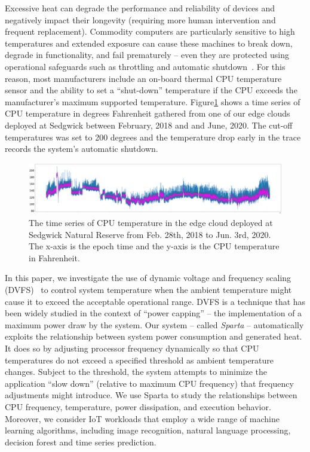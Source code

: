 Excessive heat can degrade the performance and reliability of devices and negatively
impact their longevity (requiring more human intervention and frequent
replacement). Commodity computers are particularly sensitive to high temperatures and
extended exposure can cause these machines to break down, degrade in functionality,
and fail prematurely -- even they are protected using operational safeguards
such as throttling and automatic shutdown~\cite{ref:overheating}.
For this reason, most manufacturers include an on-board thermal CPU
temperature sensor and the ability to set a ``shut-down'' temperature if the
CPU exceeds the manufacturer's maximum supported temperature.
Figure\ref{fig:time_series} shows a time series of CPU temperature in degrees Fahrenheit gathered
from one of
our edge clouds deployed at Sedgwick between February, 2018 and and June,
2020. The cut-off temperatures was set to 200 degrees and the temperature drop
early in the trace records the system's automatic shutdown.

\begin{figure}
\includegraphics[width=\textwidth]{figures/time_series.png}
\caption{The time series of CPU temperature in the edge cloud deployed at Sedgwick Natural Reserve from Feb. 28th, 2018 to Jun. 3rd, 2020. The x-axis is the epoch time and the y-axis is the CPU temperature in Fahrenheit. } \label{fig:time_series}
\end{figure}

In this paper, we investigate the use of dynamic voltage and frequency scaling
(DVFS)~\cite{XXX} to control system temperature when the ambient temperature
might cause it to exceed the acceptable operational range.  DVFS is a technique
that has been widely studied in the context of ``power capping'' -- the
implementation of a maximum power draw by the system.  Our system -- called
\textit{Sparta} --  automatically exploits the relationship between system
power consumption and generated heat.  It does so by adjusting processor
frequency dynamically so that CPU temperatures do not exceed a specified
threshold as ambient temperature changes.  Subject to the threshold, the
system attempts to minimize the application ``slow down'' (relative to maximum
CPU frequency) that frequency adjustments might introduce.  
We use Sparta to study the relationships between CPU frequency,
temperature, power dissipation, and execution behavior. Moreover, we consider
IoT workloads that employ a wide range of machine learning algorithms,
including image recognition, natural language processing, decision forest and
time series prediction. 

